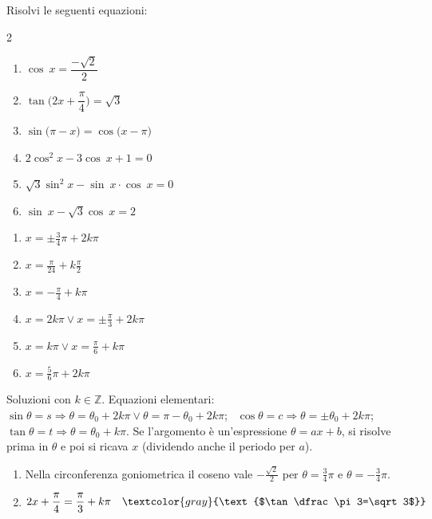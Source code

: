 
\begin{question}[ID=4.1, subtitle={Equazioni goniometriche di vario tipo — serie 1}, tags={goniometria, equazioni goniometriche}, difficulty=media]
Risolvi le seguenti equazioni:
\begin{multicols}{2}
\begin{enumerate}
\item $\cos \ x = \dfrac{-\sqrt{2}}{2}$
\item $\tan \Big( 2x + \dfrac{\pi}{4}\Big) = \sqrt{3}$
\item $\sin \Big(\pi - x \Big) = \cos \Big(x -\pi\Big)$
\item $2 \cos^2x - 3\cos \ x +1 = 0$
\item $\sqrt{3} \sin^2 x - \sin \ x \cdot \cos \ x = 0$
\item $\sin \ x - \sqrt{3} \cos \ x = 2$
\end{enumerate}
\end{multicols}
\begin{solution}
\begin{enumerate}
    \item $x=\pm\tfrac34\pi+2k\pi$
    \item $x=\tfrac{\pi}{24}+k\tfrac\pi2$
    \item $x=-\tfrac\pi4+k\pi$
    \item $x=2k\pi \vee x=\pm\tfrac\pi3+2k\pi$
    \item $x=k\pi \vee x=\tfrac\pi6+k\pi$
    \item $x=\tfrac56\pi+2k\pi$
\end{enumerate}
\end{solution}
\begin{explanation}
Soluzioni con $k\in\mathbb{Z}$. Equazioni elementari: \ $\sin\theta=s \Rightarrow \theta=\theta_0+2k\pi \vee \theta=\pi-\theta_0+2k\pi$; \ $\cos\theta=c \Rightarrow \theta=\pm\theta_0+2k\pi$; \ $\tan\theta=t \Rightarrow \theta=\theta_0+k\pi$. Se l'argomento è un'espressione $\theta=ax+b$, si risolve prima in $\theta$ e poi si ricava $x$ (dividendo anche il periodo per $a$).
\begin{enumerate}
    \item Nella circonferenza goniometrica il coseno vale $-\tfrac{\sqrt2}{2}$ per $\theta=\tfrac34\pi$ e $\theta=-\tfrac34\pi$.
    \item \[\begin{aligned}
    2x+\dfrac\pi4 &= \dfrac\pi3+k\pi && \textcolor{gray}{\text{$\tan\dfrac\pi3=\sqrt3$}}\\

\end{aligned}\]
\end{enumerate}
\end{explanation}
\end{question}
